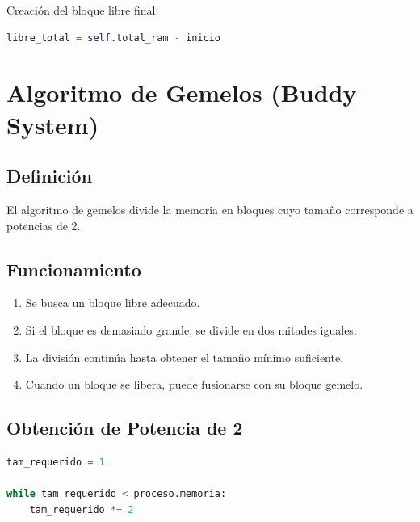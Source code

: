 Creación del bloque libre final:

\begin{lstlisting}[language=Python]
libre_total = self.total_ram - inicio
\end{lstlisting}


\section{Algoritmo de Gemelos (Buddy System)}

\subsection{Definición}

El algoritmo de gemelos divide la memoria en bloques cuyo tamaño corresponde a potencias de 2.

\subsection{Funcionamiento}

\begin{enumerate}
    \item Se busca un bloque libre adecuado.
    
    \item Si el bloque es demasiado grande, se divide en dos mitades iguales.
    
    \item La división continúa hasta obtener el tamaño mínimo suficiente.
    
    \item Cuando un bloque se libera, puede fusionarse con su bloque gemelo.
\end{enumerate}


\subsection{Obtención de Potencia de 2}

\begin{lstlisting}[language=Python]
tam_requerido = 1

while tam_requerido < proceso.memoria:
    tam_requerido *= 2
\end{lstlisting}



